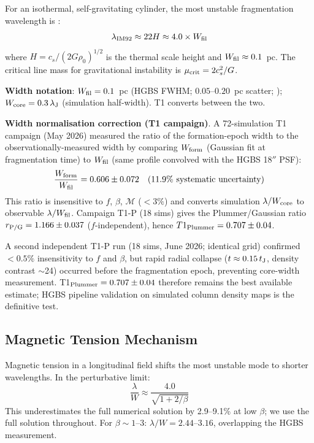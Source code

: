 \documentclass[twoside,twocolumn]{mnras}
\begin{document}
For an isothermal, self-gravitating cylinder, the most unstable fragmentation wavelength
is \citep{Inutsuka1992}:
\begin{equation}
\lambda_{\rm IM92} \approx 22 H \approx 4.0 \times W_{\rm fil}
\label{eq:im92}
\end{equation}
where $H = c_s/(2G\rho_0)^{1/2}$ is the thermal scale height and $W_{\rm fil} \approx 0.1$~pc.
The critical line mass for gravitational instability is $\mu_{\rm crit} = 2c_s^2/G$.

\textbf{Width notation}: $W_{\rm fil} = 0.1$~pc (HGBS FWHM; $0.05$--$0.20$~pc scatter;
\citealt{Panopoulou2022}); $W_{\rm core} = 0.3\,\lambda_{\rm J}$ (simulation half-width).
T1 converts between the two.

\textbf{Width normalisation correction (T1 campaign)}.%
\label{sec:width_correction}
A 72-simulation T1 campaign (May 2026) measured the ratio of the formation-epoch width
to the observationally-measured width by comparing $W_{\rm form}$ (Gaussian fit at
fragmentation time) to $W_{\rm fil}$ (same profile convolved with the HGBS 18$''$ PSF):
\begin{equation}
\frac{W_{\rm form}}{W_{\rm fil}} = 0.606 \pm 0.072 \quad (11.9\% \text{ systematic uncertainty})
\label{eq:t1_correction}
\end{equation}
This ratio is insensitive to $f$, $\beta$, $\mathcal{M}$ ($<3\%$) and converts
simulation $\lambda/W_{\rm core}$ to observable $\lambda/W_{\rm fil}$. Campaign T1-P
(18 sims) gives the Plummer/Gaussian ratio $r_{\rm P/G} = 1.166 \pm 0.037$
($f$-independent), hence $T1_{\rm Plummer} = 0.707 \pm 0.04$.

A second independent T1-P run (18 sims, June 2026; identical grid) confirmed
$<0.5\%$ insensitivity to $f$ and $\beta$, but rapid radial collapse
($t \approx 0.15\,t_{\rm J}$, density contrast $\sim$24) occurred before the
fragmentation epoch, preventing core-width measurement.
T1$_{\rm Plummer} = 0.707 \pm 0.04$ therefore remains the best available estimate;
HGBS pipeline validation on simulated column density maps is the definitive test.

\subsection{Magnetic Tension Mechanism}

Magnetic tension in a longitudinal field \citep{Nakamura1993} shifts the most unstable
mode to shorter wavelengths. In the perturbative limit:
\begin{equation}
\frac{\lambda}{W} \approx \frac{4.0}{\sqrt{1 + 2/\beta}}
\label{eq:tension}
\end{equation}
This underestimates the full numerical solution by 2.9--9.1\% at low $\beta$; we use
the full solution throughout. For $\beta \sim 1$--$3$: $\lambda/W = 2.44$--$3.16$,
overlapping the HGBS measurement.
\end{document}
